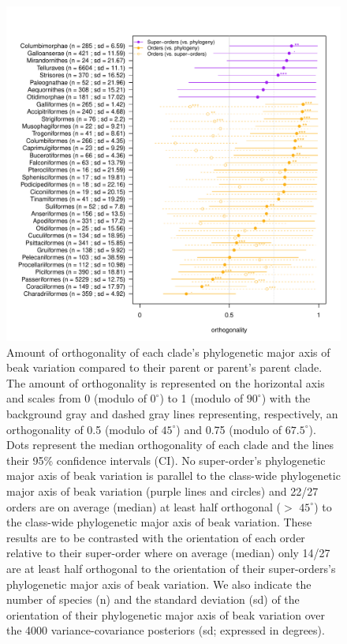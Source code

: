 \documentclass[12pt,letterpaper]{article}
\begin{document}


\begin{figure}[!htbp]
\centering
   \includegraphics[width=1\textwidth]{Figures/orthogonality_results.pdf}
\caption{\scriptsize{Amount of orthogonality of each clade's phylogenetic major axis of beak variation compared to their parent or parent's parent clade.
The amount of orthogonality is represented on the horizontal axis and scales from 0 (modulo of $0^\circ$) to 1 (modulo of $90^\circ$) with the background gray and dashed gray lines representing, respectively, an orthogonality of 0.5 (modulo of $45^\circ$) and 0.75 (modulo of $67.5^\circ$).
Dots represent the median orthogonality of each clade and the lines their 95\% confidence intervals (CI).
No super-order's phylogenetic major axis of beak variation is parallel to the class-wide phylogenetic major axis of beak variation (purple lines and circles) and 22/27 orders are on average (median) at least half orthogonal ($>$  $45^\circ$) to the class-wide phylogenetic major axis of beak variation.
These results are to be contrasted with the orientation of each order relative to their super-order where on average (median) only 14/27 are at least half orthogonal to the orientation of their super-orders’s phylogenetic major axis of beak variation.
We also indicate the number of species (n) and the standard deviation (sd) of the orientation of their phylogenetic major axis of beak variation over the 4000 variance-covariance posteriors (sd; expressed in degrees).
}}
\end{figure}
\end{document}
